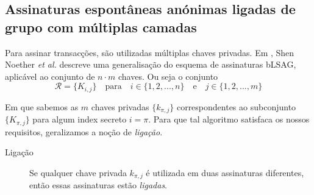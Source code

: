 \begin{description}

\section{Assinaturas espontâneas anónimas ligadas de grupo com múltiplas camadas}
\label{sec:MLSAG}

Para assinar transacções, são utilizadas múltiplas chaves privadas. Em \cite{MRL-0005-ringct}, Shen Noether {\em et al.} descreve uma generalisação do esquema de assinaturas bLSAG, aplicável ao conjunto de \(n \cdot m\) chaves. Ou seja o conjunto\vspace{.175cm}
\[\mathcal{R} = \{K_{i,j}\}  \quad \textrm{para} \quad  i \in \{1, 2, ..., n\} \quad \textrm{e} \quad j \in \{1, 2, ..., m\}\]


Em que sabemos as $m$ chaves privadas \(\{k_{\pi, j}\}\) correspondentes ao subconjunto \(\{K_{\pi, j}\}\) para algum index secreto \(i = \pi\). Para que tal algoritmo satisfaca os nossos requisitos, geralizamos a noção de {\em ligação}.

\begin{description}
	\item[Ligação] Se qualquer chave privada \(k_{\pi, j}\) é utilizada em duas assinaturas diferentes, então essas assinaturas estão {\em ligadas}.  
\end{description}


\end{description}
